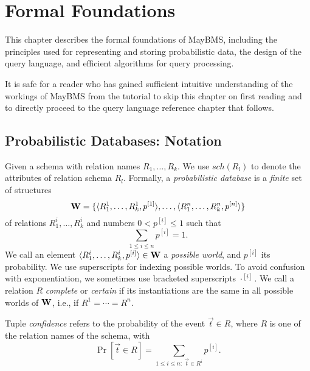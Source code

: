 



\chapter{Formal Foundations}


This chapter describes the formal foundations of MayBMS, including the
principles used for representing and storing probabilistic data, the
design of the query language, and efficient algorithms for query processing.

It is safe for a reader who has gained sufficient intuitive understanding
of the workings of MayBMS from the tutorial to skip this chapter on
first reading and to directly proceed to the query language reference
chapter that follows.



\section{Probabilistic Databases: Notation}
\label{sect:probdb}


\def\ww{{\bf W}}


Given a schema with relation names $R_1, \dots, R_k$. We use $sch(R_l)$ to denote the attributes of relation schema $R_l$.
Formally,
a {\em probabilistic database}\/ is a {\em finite}\/ set of structures
\[
\ww = \{ \tuple{R_1^1, \dots, R_k^1, p^{[1]}}, \dots,
         \tuple{R_1^n, \dots, R_k^n, p^{[n]}} \}
\]
of relations $R_1^i, \dots, R_k^i$ and numbers $0 < p^{[i]} \le 1$ such that
\[
\sum_{1 \le i \le n} p^{[i]} = 1.
\]
%
We call an element $\tuple{R_1^i, \dots, R_k^i, p^{[i]}} \in \ww$
a {\em possible world}\/, and $p^{[i]}$ its probability.
We use superscripts for indexing possible worlds.
To avoid confusion with exponentiation,
we sometimes use bracketed superscripts $\cdot^{[i]}$.
%
We call a relation $R$ {\em complete}\/ or {\em certain}\/
if its instantiations are the same in all possible worlds of $\ww$, i.e., if $R^1 = \cdots = R^n$.

Tuple {\em confidence}\/ refers to the probability of the event $\vec{t} \in R$, where $R$ is one of the relation names of the schema, with
\[
\Pr[\vec{t} \in R] = \sum_{1 \le i \le n:\; \vec{t} \in R^i} p^{[i]}.
\]









